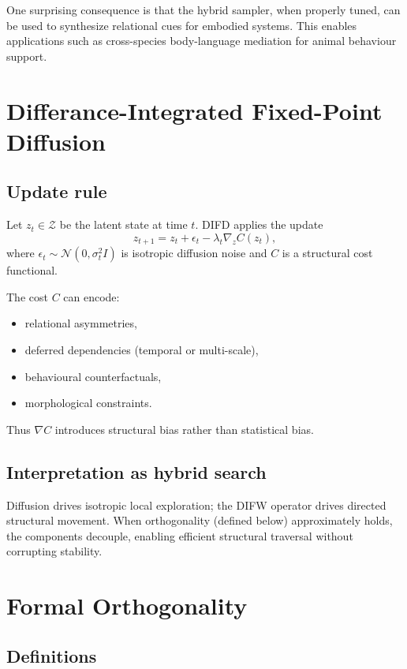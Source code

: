 \documentclass[11pt]{article}
\begin{document}
One surprising consequence is that the hybrid sampler, when properly tuned, can be used 
to synthesize relational cues for embodied systems. This enables applications such as 
cross-species body-language mediation for animal behaviour support.

\section{Differance-Integrated Fixed-Point Diffusion}

\subsection{Update rule}

Let $z_t \in \mathcal{Z}$ be the latent state at time $t$. DIFD applies the update
\begin{equation}
z_{t+1} = z_t + \epsilon_t - \lambda_t \nabla_z C(z_t),
\end{equation}
where $\epsilon_t \sim \mathcal{N}(0, \sigma_t^2 I)$ is isotropic diffusion noise
and $C$ is a structural cost functional.

The cost $C$ can encode:
\begin{itemize}[itemsep=2pt]
    \item relational asymmetries,
    \item deferred dependencies (temporal or multi-scale),
    \item behavioural counterfactuals,
    \item morphological constraints.
\end{itemize}

Thus $\nabla C$ introduces structural bias rather than statistical bias.

\subsection{Interpretation as hybrid search}

Diffusion drives isotropic local exploration; the DIFW operator drives directed 
structural movement. When orthogonality (defined below) approximately holds, the components 
decouple, enabling efficient structural traversal without corrupting stability.

\section{Formal Orthogonality}

\subsection{Definitions}
\end{document}

